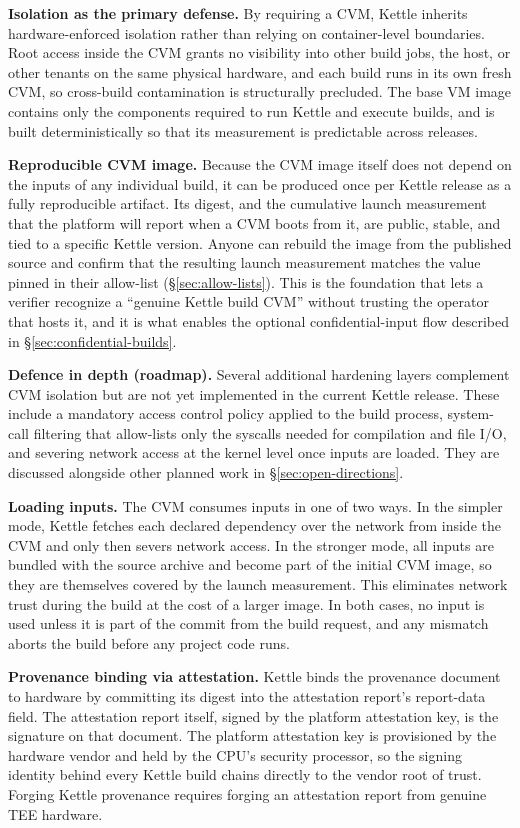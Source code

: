 \documentclass[11pt]{article}
\begin{document}
\textbf{Isolation as the primary defense.} By requiring a CVM, Kettle inherits hardware-enforced isolation rather than relying on container-level boundaries. Root access inside the CVM grants no visibility into other build jobs, the host, or other tenants on the same physical hardware, and each build runs in its own fresh CVM, so cross-build contamination is structurally precluded. The base VM image contains only the components required to run Kettle and execute builds, and is built deterministically so that its measurement is predictable across releases.

\textbf{Reproducible CVM image.} Because the CVM image itself does not depend on the inputs of any individual build, it can be produced once per Kettle release as a fully reproducible artifact. Its digest, and the cumulative launch measurement that the platform will report when a CVM boots from it, are public, stable, and tied to a specific Kettle version. Anyone can rebuild the image from the published source and confirm that the resulting launch measurement matches the value pinned in their allow-list (\S\ref{sec:allow-lists}). This is the foundation that lets a verifier recognize a ``genuine Kettle build CVM'' without trusting the operator that hosts it, and it is what enables the optional confidential-input flow described in \S\ref{sec:confidential-builds}.

\textbf{Defence in depth (roadmap).} Several additional hardening layers complement CVM isolation but are not yet implemented in the current Kettle release. These include a mandatory access control policy applied to the build process, system-call filtering that allow-lists only the syscalls needed for compilation and file I/O, and severing network access at the kernel level once inputs are loaded. They are discussed alongside other planned work in \S\ref{sec:open-directions}.

\textbf{Loading inputs.} The CVM consumes inputs in one of two ways. In the simpler mode, Kettle fetches each declared dependency over the network from inside the CVM and only then severs network access. In the stronger mode, all inputs are bundled with the source archive and become part of the initial CVM image, so they are themselves covered by the launch measurement. This eliminates network trust during the build at the cost of a larger image. In both cases, no input is used unless it is part of the commit from the build request, and any mismatch aborts the build before any project code runs.

\textbf{Provenance binding via attestation.} Kettle binds the provenance document to hardware by committing its digest into the attestation report's report-data field. The attestation report itself, signed by the platform attestation key, is the signature on that document. The platform attestation key is provisioned by the hardware vendor and held by the CPU's security processor, so the signing identity behind every Kettle build chains directly to the vendor root of trust. Forging Kettle provenance requires forging an attestation report from genuine TEE hardware.
\end{document}
